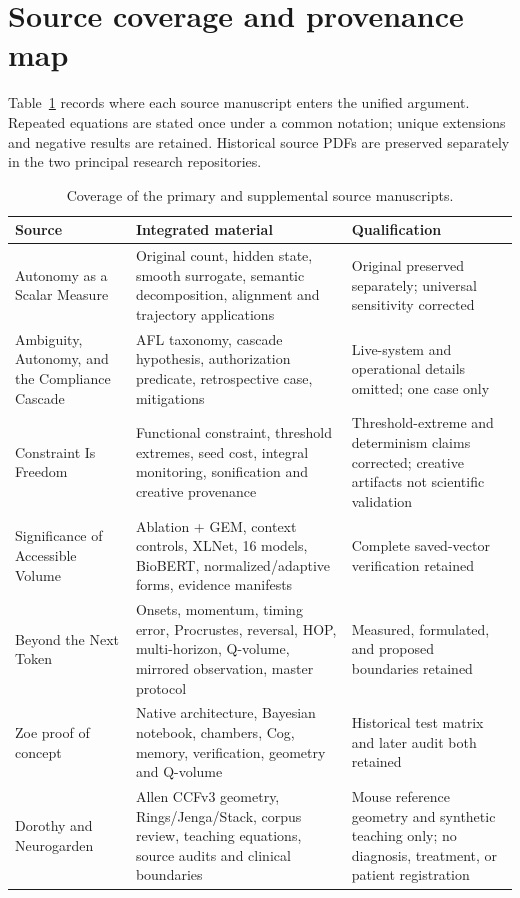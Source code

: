 \section{Source coverage and provenance map}
\label{app:source-coverage}
Table~\ref{tab:source-coverage} records where each source manuscript enters the unified argument. Repeated equations are stated once under a common notation; unique extensions and negative results are retained. Historical source PDFs are preserved separately in the two principal research repositories.
\begin{table}[htbp]
\centering
\caption{Coverage of the primary and supplemental source manuscripts.}
\label{tab:source-coverage}
{\scriptsize
\begin{tabularx}{\textwidth}{p{4.0cm}Xp{3.5cm}}
\toprule
Source&Integrated material&Qualification\\
\midrule
Autonomy as a Scalar Measure&Original count, hidden state, smooth surrogate, semantic decomposition, alignment and trajectory applications&Original preserved separately; universal sensitivity corrected\\
Ambiguity, Autonomy, and the Compliance Cascade&AFL taxonomy, cascade hypothesis, authorization predicate, retrospective case, mitigations&Live-system and operational details omitted; one case only\\
Constraint Is Freedom&Functional constraint, threshold extremes, seed cost, integral monitoring, sonification and creative provenance&Threshold-extreme and determinism claims corrected; creative artifacts not scientific validation\\
Significance of Accessible Volume&Ablation + GEM, context controls, XLNet, 16 models, BioBERT, normalized/adaptive forms, evidence manifests&Complete saved-vector verification retained\\
Beyond the Next Token&Onsets, momentum, timing error, Procrustes, reversal, HOP, multi-horizon, Q-volume, mirrored observation, master protocol&Measured, formulated, and proposed boundaries retained\\
Zoe proof of concept&Native architecture, Bayesian notebook, chambers, Cog, memory, verification, geometry and Q-volume&Historical test matrix and later audit both retained\\
Dorothy and Neurogarden&Allen CCFv3 geometry, Rings/Jenga/Stack, corpus review, teaching equations, source audits and clinical boundaries&Mouse reference geometry and synthetic teaching only; no diagnosis, treatment, or patient registration\\

\end{tabularx}}
\end{table}
